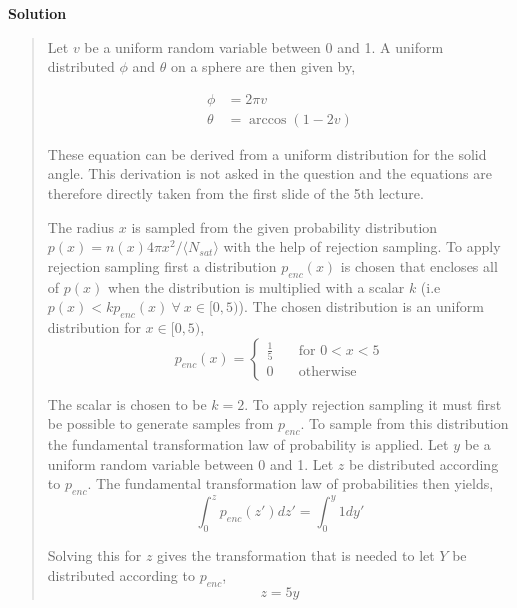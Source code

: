 \textbf{Solution} 
\begin{quote}
Let $v$ be a uniform random variable between 0 and 1. A uniform distributed $\phi$ and $\theta$ on a sphere are then given by,

\begin{align}
\phi &= 2 \pi v \\
\theta &=  \arccos(1-2v)
\end{align}

These equation can be derived from a uniform distribution for the solid angle. This derivation is not asked in the question and the equations are therefore directly taken from the first slide of the 5th lecture.

The radius $x$ is sampled from the given probability distribution $p(x) = n(x)4 \pi x^2/ \langle N_{sat} \rangle$ with the help of rejection sampling. To apply rejection sampling first a distribution $p_{enc}(x)$ is chosen that encloses all of $p(x)$ when the distribution is multiplied with a scalar $k$ (i.e $p(x) < kp_{enc}(x) \ \forall \ x \in[0,5)$). The chosen distribution is an uniform distribution for $x \in[0,5)$,
\begin{equation}
p_{enc}(x) = 
     \begin{cases}
       \frac{1}{5} &\quad\text{for $0< x < 5$} \\
       0  &\quad\text{otherwise}
     \end{cases}
\end{equation}  

The scalar is chosen to be $k = 2$. To apply rejection sampling it must first be possible to generate samples from $p_{enc}$. To sample from this distribution the fundamental transformation law of probability is applied. Let $y$ be a uniform random variable between 0 and 1.  Let $z$ be distributed according to $p_{enc}$. The fundamental transformation law of probabilities then yields, 
\begin{equation}
\int_0^z p_{enc}(z') dz' = \int_0^y 1 dy' 
\end{equation}

Solving this for $z$ gives the transformation that is needed to let $Y$ be distributed according to $p_{enc}$,
\begin{equation}
 z = 5y
\end{equation}



\end{quote}
